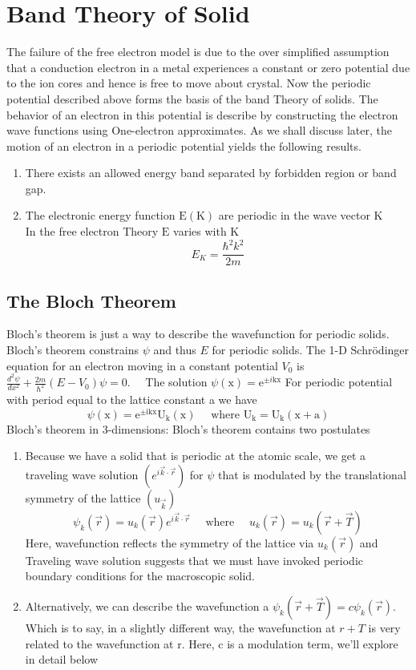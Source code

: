 \section{Band Theory of Solid}
The failure of the free electron model is due to the over simplified assumption that a conduction electron in a metal experiences a constant or zero potential due to the ion cores and hence is free to move about crystal. Now the periodic potential described above forms the basis of the band Theory of solids. The behavior of an electron in this potential is describe by constructing the electron wave functions using One-electron approximates. As we shall discuss later, the motion of an electron in a periodic potential yields the following results.
\begin{enumerate}[label=\alph*)]
	\item There exists an allowed energy band separated by forbidden region or band gap.
\item  The electronic energy function $\mathrm{E}(\mathrm{K})$ are periodic in the wave vector $\mathrm{K}$\\
	In the free electron Theory $\mathrm{E}$ varies with $\mathrm{K}$
	$$
	E_{K}=\frac{\hbar^{2} k^{2}}{2 m}
	$$
\end{enumerate}
\subsection{The Bloch Theorem}
Bloch's theorem is just a way to describe the wavefunction for periodic solids. Bloch's theorem constrains $\psi$ and thus $E$ for periodic solids.
The 1-D Schrödinger equation for an electron moving in a constant potential $V_{0}$ is $\frac{d^{2} \psi}{d x^{2}}+\frac{2 m}{\hbar^{2}}\left(E-V_{0}\right) \psi=0 . \quad$ The solution $\psi(\mathrm{x})=\mathrm{e}^{\pm i \mathrm{kx}}$
For periodic potential with period equal to the lattice constant a we have
$$
\psi(\mathrm{x})=\mathrm{e}^{\pm \mathrm{ikx}} \mathrm{U}_{\mathrm{k}}(\mathrm{x}) \quad \text { where } \mathrm{U}_{\mathrm{k}}=\mathrm{U}_{\mathrm{k}}(\mathrm{x}+\mathrm{a})
$$
Bloch's theorem in 3-dimensions: Bloch's theorem contains two postulates
\begin{enumerate}
	\item  Because we have a solid that is periodic at the atomic scale, we get a traveling wave solution $\left(e^{i \vec{k} \cdot \vec{r}}\right)$ for $\psi$ that is modulated by the translational symmetry of the lattice $\left(u_{\vec{k}}\right)$
	$$
	\psi_{k}(\vec{r})=u_{k}(\vec{r}) e^{i \vec{k} \cdot \vec{r}} \quad \text { where } \quad u_{k}(\vec{r})=u_{k}(\vec{r}+\vec{T})
	$$
	Here, wavefunction reflects the symmetry of the lattice via $u_{k}(\vec{r})$ and Traveling wave solution suggests that we must have invoked periodic boundary conditions for the macroscopic solid.
	\item Alternatively, we can describe the wavefunction a $\psi_{k}(\vec{r}+\vec{T})=c \psi_{k}(\vec{r})$. Which is to say, in a slightly different way, the wavefunction at $r+T$ is very related to the wavefunction at $\mathrm{r}$. Here, $\mathrm{c}$ is a modulation term, we'll explore in detail below
\end{enumerate}
